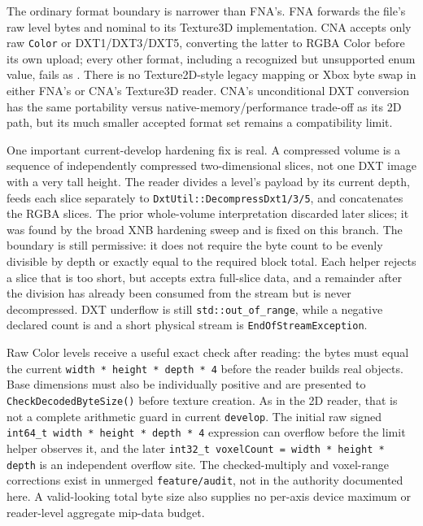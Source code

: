 The ordinary format boundary is narrower than FNA's. FNA forwards the file's raw level bytes and
nominal  to its Texture3D implementation. CNA accepts only raw
\texttt{Color} or DXT1/DXT3/DXT5, converting the latter to RGBA Color before its own upload;
every other format, including a recognized but unsupported enum value, fails as
. There is no Texture2D-style legacy mapping or Xbox byte swap in
either FNA's or CNA's Texture3D reader. CNA's unconditional DXT conversion has the same portability
versus native-memory/performance trade-off as its 2D path, but its much smaller accepted format
set remains a compatibility limit.

One important current-develop hardening fix is real. A compressed volume is a sequence of
independently compressed two-dimensional slices, not one DXT image with a very tall height. The
reader divides a level's payload by its current depth, feeds each slice separately to
\texttt{DxtUtil::DecompressDxt1/3/5}, and concatenates the RGBA slices. The prior whole-volume
interpretation discarded later slices; it was found by the broad XNB hardening sweep and is fixed
on this branch. The boundary is still permissive: it does not require the byte count to be evenly
divisible by depth or exactly equal to the required block total. Each helper rejects a slice that
is too short, but accepts extra full-slice data, and a remainder after the division has already
been consumed from the stream but is never decompressed. DXT underflow is still
\texttt{std::out\_of\_range}, while a negative declared count is 
and a short physical stream is \texttt{EndOfStreamException}.

Raw Color levels receive a useful exact check after reading: the bytes must equal the current
\texttt{width * height * depth * 4} before the reader builds real  objects. Base
dimensions must also be individually positive and are presented to
\texttt{CheckDecodedByteSize()} before texture creation. As in the 2D reader, that is not a
complete arithmetic guard in current \texttt{develop}. The initial raw signed
\texttt{int64\_t width * height * depth * 4} expression can overflow before the limit helper
observes it, and the later \texttt{int32\_t voxelCount = width * height * depth} is an independent
overflow site. The checked-multiply and voxel-range corrections exist in unmerged
\texttt{feature/audit}, not in the authority documented here. A valid-looking total byte size
also supplies no per-axis device maximum or reader-level aggregate mip-data budget.

